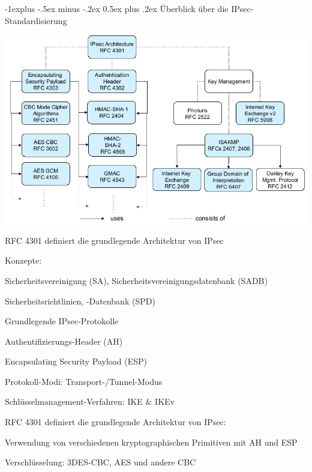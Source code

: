 \documentclass[a4paper]{article}
\makeatletter
\renewcommand{\subsection}{\@startsection{subsection}{2}{0mm}%
 {-1explus -.5ex minus -.2ex}%
 {0.5ex plus .2ex}%
 {\normalfont\normalsize\bfseries}}
\makeatother
\begin{document}
\begin{multicols}{3}
      \subsection{Überblick über die IPsec-Standardisierung}
      \begin{center}
            \includegraphics[width=.6\linewidth]{Assets/NetworkSecurity-IPsec-standardization.png}
      \end{center}
      \begin{itemize*}
            \item RFC 4301 definiert die grundlegende Architektur von IPsec
            \item Konzepte:
            \begin{itemize*}
                  \item Sicherheitsvereinigung (SA), Sicherheitsvereinigungsdatenbank (SADB)
                  \item Sicherheitsrichtlinien, -Datenbank (SPD)
            \end{itemize*}
            \item Grundlegende IPsec-Protokolle
            \begin{itemize*}
                  \item Authentifizierungs-Header (AH)
                  \item Encapsulating Security Payload (ESP)
            \end{itemize*}
            \item Protokoll-Modi: Transport-/Tunnel-Modus
            \item Schlüsselmanagement-Verfahren: IKE \& IKEv
            \item RFC 4301 definiert die grundlegende Architektur von IPsec:
            \begin{itemize*}
                  \item Verwendung von verschiedenen kryptographischen Primitiven mit AH und ESP
                  \item Verschlüsselung: 3DES-CBC, AES und andere CBC

\end{itemize*}
\end{itemize*}
\end{multicols}
\end{document}
